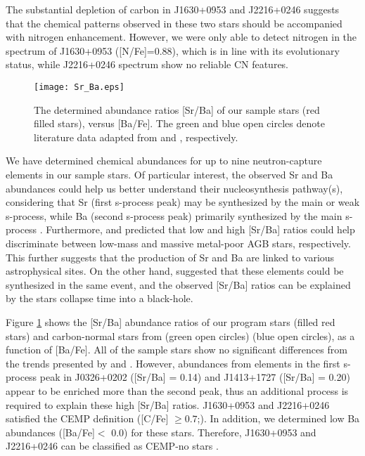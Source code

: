 The substantial depletion of carbon in J1630+0953 and J2216+0246 suggests that
the chemical patterns observed in these two stars should be accompanied with
nitrogen enhancement. However, we were only able to detect nitrogen in the
spectrum of J1630+0953 ([N/Fe]=0.88), which is in line with its
evolutionary status, while J2216+0246 spectrum show no reliable CN features.  


\begin{figure}[!ht]
\centering
\texttt{[image: Sr\_Ba.eps]} 
\caption{The determined abundance ratios [Sr/Ba] of our sample stars (red filled stars), versus [Ba/Fe]. The green and blue open circles denote literature data adapted from \citet{2007A&A...476..935F} and
\citet{2013ApJ...762...26Y}, respectively.}
\label{fig:Sr_Ba}
\end{figure}

We have determined chemical abundances for up to nine neutron-capture elements
in our sample stars. Of particular interest, the observed Sr and Ba abundances
could help us better understand their nucleosynthesis pathway(s), considering
that Sr (first s-process peak) may be synthesized by the main or weak s-process,
while Ba (second s-process peak) primarily synthesized by the main s-process
\citep{2003ApJ...588.1099Q, 2008ApJ...687..272Q, 2011A&A...530A.105A,
2014ApJ...797..123H}. Furthermore, \citet{2009ApJ...696..797C,
2011ApJS..197...17C} and \citet{2012ApJ...747....2L} predicted that low and
high [Sr/Ba] ratios could help discriminate between low-mass and
massive metal-poor AGB stars, respectively. This further suggests that the
production of Sr and Ba are linked to various astrophysical sites. On the
other hand, \citet{2013ApJ...766L..13A} suggested that these elements could
be synthesized in the same event, and the observed [Sr/Ba] ratios can
be explained by the stars collapse time into a black-hole. 

Figure \ref{fig:Sr_Ba} shows the [Sr/Ba] abundance ratios of our program
stars (filled red stars) and carbon-normal stars from
\citet{2007A&A...476..935F} (green open circles) \citet{2013ApJ...762...26Y}
(blue open circles), as a function of [Ba/Fe]. All of the sample stars
show no significant differences from the trends presented by
\citet{2007A&A...476..935F} and \citet{2013ApJ...762...26Y}. However, abundances
from elements in the first s-process peak in J0326+0202 ([Sr/Ba] = 0.14)
and J1413+1727 ([Sr/Ba] = 0.20) appear to be enriched more than the
second peak, thus an additional process is required to explain these high
[Sr/Ba] ratios.  J1630+0953 and J2216+0246 satisfied the CEMP definition
([C/Fe] $\geq 0.7$;\citealt{2007ApJ...655..492A}). In addition,  we
determined low Ba abundances ([Ba/Fe]$<$ 0.0) for these stars.  Therefore, J1630+0953 and J2216+0246 can be classified as
CEMP-no stars \citep{2005ARA&A..43..531B, 2007ApJ...655..492A, 2014ApJ...797...21P}. 


